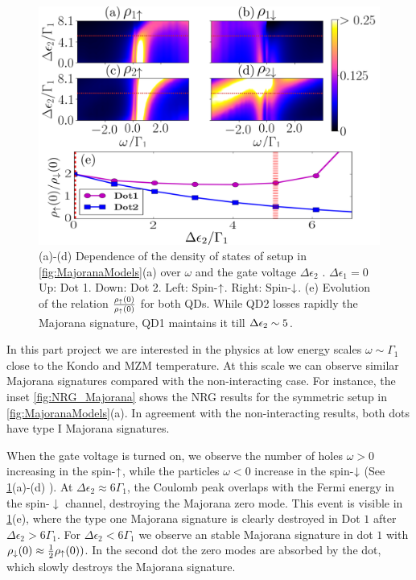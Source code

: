 \begin{figure}[H]
    \centering
    \includegraphics[scale=0.5]{IMAGES/NRG/FullEd2.png}
    \caption{\label{fig:ed2/Fermi} (a)-(d) Dependence of the density of states of setup in \ref{fig:MajoranaModels}(a) over $\omega$ and the gate voltage $\Delta \epsilon_2$ . $\Delta \epsilon_1=0$  Up: Dot 1. Down: Dot 2. Left: Spin-$\uparrow$. Right: Spin-$\downarrow$.  (e) Evolution of the relation $\frac{\rho_\uparrow(0)}{\rho_\uparrow(0)}$ for both QDs. While QD2 losses rapidly the Majorana signature, QD1 maintains it till $\Delta \epsilon_{2}\sim 5$. \protect{}}
\end{figure}



    In this part project we are interested in the physics at low energy scales $\omega \sim \Gamma_1 $ close to the Kondo and MZM temperature. At this scale we can observe similar Majorana signatures compared with the non-interacting case. For instance, the inset \ref{fig:NRG_Majorana} shows the NRG results for the symmetric setup in \ref{fig:MajoranaModels}(a). In agreement with the non-interacting results, both dots have type I Majorana signatures. 

    When the gate voltage is turned on, we observe the number of holes $\omega>0$ increasing in the spin-$\uparrow$, while the particles $\omega<0$ increase in the spin-$\downarrow$ (See \ref{fig:ed2/Fermi}(a)-(d) ). At $\Delta\epsilon_2 \approx 6\Gamma_1$, the Coulomb peak overlaps with the Fermi energy in the spin-$\downarrow$ channel, destroying the Majorana zero mode. This event is visible in \ref{fig:ed2/Fermi}(e), where the type one Majorana signature is clearly destroyed in Dot $1$ after $\Delta\epsilon_2 > 6\Gamma_1$. For $\Delta\epsilon_2 < 6\Gamma_1$ we observe an stable Majorana signature in dot $1$ with $\rho_\downarrow(0) \approx \frac{1}{2}\rho_\uparrow(0))$. In the second dot the zero modes are absorbed by the dot, which slowly destroys the Majorana signature. 

